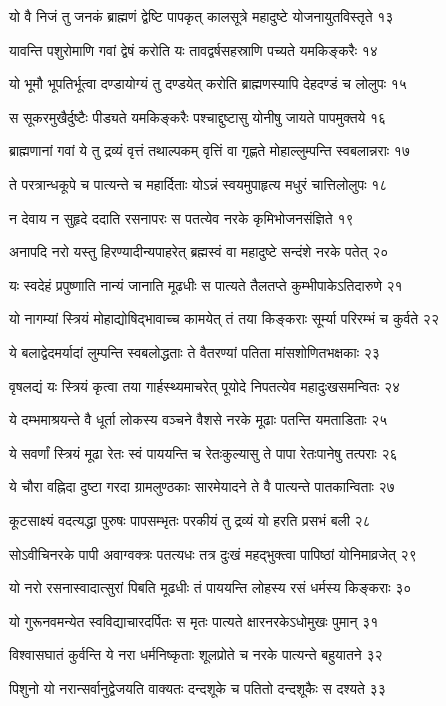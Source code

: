 यो वै निजं तु जनकं ब्राह्मणं द्वेष्टि पापकृत्
कालसूत्रे महादुष्टे योजनायुतविस्तृते १३

यावन्ति पशुरोमाणि गवां द्वेषं करोति यः
तावद्वर्षसहस्राणि पच्यते यमकिङ्करैः १४

यो भूमौ भूपतिर्भूत्वा दण्डायोग्यं तु दण्डयेत्
करोति ब्राह्मणस्यापि देहदण्डं च लोलुपः १५

स सूकरमुखैर्दुष्टैः पीड्यते यमकिङ्करैः
पश्चाद्दुष्टासु योनीषु जायते पापमुक्तये १६

ब्राह्मणानां गवां ये तु द्रव्यं वृत्तं तथाल्पकम्
वृत्तिं वा गृह्णते मोहाल्लुम्पन्ति स्वबलान्नराः १७

ते परत्रान्धकूपे च पात्यन्ते च महार्दिताः
योऽन्नं स्वयमुपाहृत्य मधुरं चात्तिलोलुपः १८

न देवाय न सुहृदे ददाति रसनापरः
स पतत्येव नरके कृमिभोजनसंज्ञिते १९

अनापदि नरो यस्तु हिरण्यादीन्यपाहरेत्
ब्रह्मस्वं वा महादुष्टे सन्दंशे नरके पतेत् २०

यः स्वदेहं प्रपुष्णाति नान्यं जानाति मूढधीः
स पात्यते तैलतप्ते कुम्भीपाकेऽतिदारुणे २१

यो नागम्यां स्त्रियं मोहाद्योषिद्भावाच्च कामयेत्
तं तया किङ्कराः सूर्म्या परिरम्भं च कुर्वते २२

ये बलाद्वेदमर्यादां लुम्पन्ति स्वबलोद्धताः
ते वैतरण्यां पतिता मांसशोणितभक्षकाः २३

वृषलद्यं यः स्त्रियं कृत्वा तया गार्हस्थ्यमाचरेत्
पूयोदे निपतत्येव महादुःखसमन्वितः २४

ये दम्भमाश्रयन्ते वै धूर्ता लोकस्य वञ्चने
वैशसे नरके मूढाः पतन्ति यमताडिताः २५

ये सवर्णां स्त्रियं मूढा रेतः स्वं पाययन्ति च
रेतःकुल्यासु ते पापा रेतःपानेषु तत्पराः २६

ये चौरा वह्निदा दुष्टा गरदा ग्रामलुण्ठकाः
सारमेयादने ते वै पात्यन्ते पातकान्विताः २७

कूटसाक्ष्यं वदत्यद्धा पुरुषः पापसम्भृतः
परकीयं तु द्रव्यं यो हरति प्रसभं बली २८

सोऽवीचिनरके पापी अवाग्वक्त्रः पतत्यधः
तत्र दुःखं महद्भुक्त्वा पापिष्ठां योनिमाव्रजेत् २९

यो नरो रसनास्वादात्सुरां पिबति मूढधीः
तं पाययन्ति लोहस्य रसं धर्मस्य किङ्कराः ३०

यो गुरूनवमन्येत स्वविद्याचारदर्पितः
स मृतः पात्यते क्षारनरकेऽधोमुखः पुमान् ३१

विश्वासघातं कुर्वन्ति ये नरा धर्मनिष्कृताः
शूलप्रोते च नरके पात्यन्ते बहुयातने ३२

पिशुनो यो नरान्सर्वानुद्वेजयति वाक्यतः
दन्दशूके च पतितो दन्दशूकैः स दश्यते ३३

